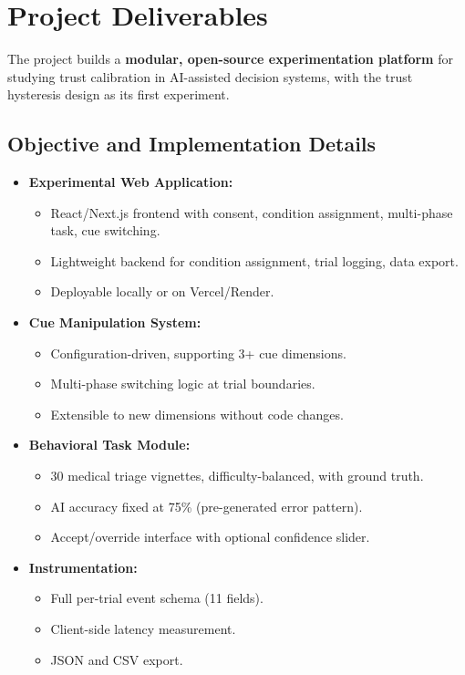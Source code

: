 \documentclass[12pt]{article}
\begin{document}
\section{Project Deliverables}

The project builds a \textbf{modular, open-source experimentation platform} for studying trust calibration in AI-assisted decision systems, with the trust hysteresis design as its first experiment.

\subsection{Objective and Implementation Details}

\begin{itemize}
\item \textbf{Experimental Web Application:}
\begin{itemize}
\item React/Next.js frontend with consent, condition assignment, multi-phase task, cue switching.
\item Lightweight backend for condition assignment, trial logging, data export.
\item Deployable locally or on Vercel/Render.
\end{itemize}

\item \textbf{Cue Manipulation System:}
\begin{itemize}
\item Configuration-driven, supporting 3+ cue dimensions.
\item Multi-phase switching logic at trial boundaries.
\item Extensible to new dimensions without code changes.
\end{itemize}

\item \textbf{Behavioral Task Module:}
\begin{itemize}
\item 30 medical triage vignettes, difficulty-balanced, with ground truth.
\item AI accuracy fixed at 75\% (pre-generated error pattern).
\item Accept/override interface with optional confidence slider.
\end{itemize}

\item \textbf{Instrumentation:}
\begin{itemize}
\item Full per-trial event schema (11 fields).
\item Client-side latency measurement.
\item JSON and CSV export.
\end{itemize}


\end{itemize}
\end{document}
